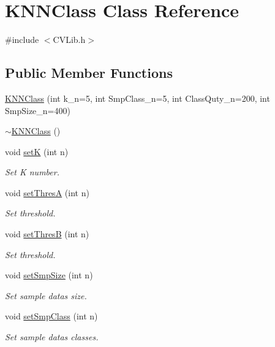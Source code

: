\hypertarget{class_k_n_n_class}{}\section{K\+N\+N\+Class Class Reference}
\label{class_k_n_n_class}


{\ttfamily \#include $<$C\+V\+Lib.\+h$>$}

\subsection*{Public Member Functions}
\begin{DoxyCompactItemize}
\item 
\hyperlink{class_k_n_n_class_adff8111c0e8ea52cf04cf76d2a99887e}{K\+N\+N\+Class} (int k\+\_\+n=5, int Smp\+Class\+\_\+n=5, int Class\+Quty\+\_\+n=200, int Smp\+Size\+\_\+n=400)
\item 
\hyperlink{class_k_n_n_class_ad4d04934b9fa20507050bb50dad7479a}{$\sim$\+K\+N\+N\+Class} ()
\item 
void \hyperlink{class_k_n_n_class_a4e43ed8ce6e319fe2c888bdc128ccf61}{setK} (int n)
\begin{DoxyCompactList}\small\item\em Set K number. \end{DoxyCompactList}\item 
void \hyperlink{class_k_n_n_class_ab495a8c7a688ebcff757330fba1d740f}{set\+ThresA} (int n)
\begin{DoxyCompactList}\small\item\em Set threshold. \end{DoxyCompactList}\item 
void \hyperlink{class_k_n_n_class_a85345c888647e186368f84d94dae8b4b}{set\+ThresB} (int n)
\begin{DoxyCompactList}\small\item\em Set threshold. \end{DoxyCompactList}\item 
void \hyperlink{class_k_n_n_class_af104fbeeadef93ed7d31a427be5156d2}{set\+Smp\+Size} (int n)
\begin{DoxyCompactList}\small\item\em Set sample data\textquotesingle{}s size. \end{DoxyCompactList}\item 
void \hyperlink{class_k_n_n_class_aa853c7802abaefe8b07a2f86651ac680}{set\+Smp\+Class} (int n)
\begin{DoxyCompactList}\small\item\em Set sample data\textquotesingle{}s classes. \end{DoxyCompactList}\item 

\end{DoxyCompactItemize}
